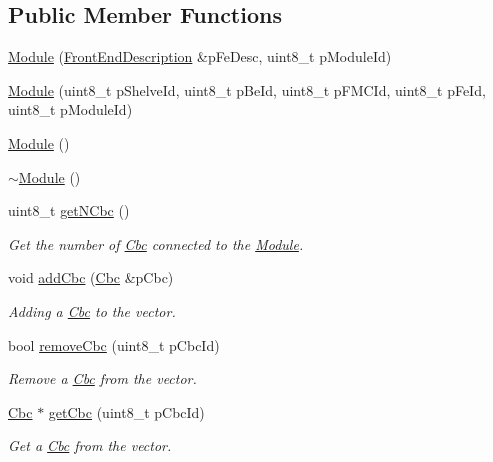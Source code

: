 \subsection*{Public Member Functions}
\begin{DoxyCompactItemize}
\item 
\hyperlink{class_ph2___hw_description_1_1_module_a8e5a7e697a51121a0a701c61f319b5e9}{Module} (\hyperlink{class_ph2___hw_description_1_1_front_end_description}{Front\-End\-Description} \&p\-Fe\-Desc, uint8\-\_\-t p\-Module\-Id)
\item 
\hyperlink{class_ph2___hw_description_1_1_module_acb5e5f17c946438f985c209563060f26}{Module} (uint8\-\_\-t p\-Shelve\-Id, uint8\-\_\-t p\-Be\-Id, uint8\-\_\-t p\-F\-M\-C\-Id, uint8\-\_\-t p\-Fe\-Id, uint8\-\_\-t p\-Module\-Id)
\item 
\hyperlink{class_ph2___hw_description_1_1_module_aaec7dd439bdf7a1db3f2136569a00125}{Module} ()
\item 
\hyperlink{class_ph2___hw_description_1_1_module_a8142f34ea2308ed78e8d0dbb042bc5f3}{$\sim$\-Module} ()
\item 
uint8\-\_\-t \hyperlink{class_ph2___hw_description_1_1_module_a8703442b1055c0c38b4157fc155ac084}{get\-N\-Cbc} ()
\begin{DoxyCompactList}\small\item\em Get the number of \hyperlink{class_ph2___hw_description_1_1_cbc}{Cbc} connected to the \hyperlink{class_ph2___hw_description_1_1_module}{Module}. \end{DoxyCompactList}\item 
void \hyperlink{class_ph2___hw_description_1_1_module_ac2743d5056bc3053bf472e5fd94bbf14}{add\-Cbc} (\hyperlink{class_ph2___hw_description_1_1_cbc}{Cbc} \&p\-Cbc)
\begin{DoxyCompactList}\small\item\em Adding a \hyperlink{class_ph2___hw_description_1_1_cbc}{Cbc} to the vector. \end{DoxyCompactList}\item 
bool \hyperlink{class_ph2___hw_description_1_1_module_a0aa7c940311bd13a32fd4e0f251c2d27}{remove\-Cbc} (uint8\-\_\-t p\-Cbc\-Id)
\begin{DoxyCompactList}\small\item\em Remove a \hyperlink{class_ph2___hw_description_1_1_cbc}{Cbc} from the vector. \end{DoxyCompactList}\item 
\hyperlink{class_ph2___hw_description_1_1_cbc}{Cbc} $\ast$ \hyperlink{class_ph2___hw_description_1_1_module_a05ccbee9ca3eb8022e359b5e9dabe783}{get\-Cbc} (uint8\-\_\-t p\-Cbc\-Id)
\begin{DoxyCompactList}\small\item\em Get a \hyperlink{class_ph2___hw_description_1_1_cbc}{Cbc} from the vector. \end{DoxyCompactList}\end{DoxyCompactItemize}
